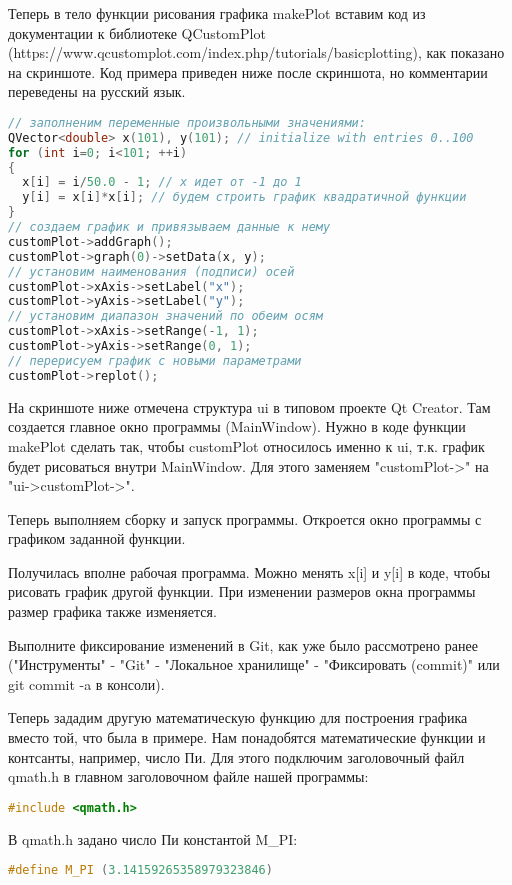 Теперь в тело функции рисования графика makePlot вставим код из документации к библиотеке QCustomPlot (https://www.qcustomplot.com/index.php/tutorials/basicplotting), как показано на скриншоте. Код примера приведен ниже после скриншота, но комментарии переведены на русский язык.

\begin{lstlisting}[language=c++]
// заполненим переменные произвольными значениями:
QVector<double> x(101), y(101); // initialize with entries 0..100
for (int i=0; i<101; ++i)
{
  x[i] = i/50.0 - 1; // x идет от -1 до 1
  y[i] = x[i]*x[i]; // будем строить график квадратичной функции
}
// создаем график и привязываем данные к нему
customPlot->addGraph();
customPlot->graph(0)->setData(x, y);
// установим наименования (подписи) осей
customPlot->xAxis->setLabel("x");
customPlot->yAxis->setLabel("y");
// установим диапазон значений по обеим осям
customPlot->xAxis->setRange(-1, 1);
customPlot->yAxis->setRange(0, 1);
// перерисуем график с новыми параметрами
customPlot->replot();
\end{lstlisting}

На скриншоте ниже отмечена структура ui в типовом проекте Qt Creator. Там создается главное окно программы (MainWindow). Нужно в коде функции makePlot сделать так, чтобы customPlot относилось именно к ui, т.к. график будет рисоваться внутри MainWindow. Для этого заменяем "customPlot->" на "ui->customPlot->".

Теперь выполняем сборку и запуск программы. Откроется окно программы с графиком заданной функции.

Получилась вполне рабочая программа. Можно менять x[i] и y[i] в коде, чтобы рисовать график другой функции. При изменении размеров окна программы размер графика также изменяется.

Выполните фиксирование изменений в Git, как уже было рассмотрено ранее ("Инструменты" - "Git" - "Локальное хранилище" - "Фиксировать (commit)" или git commit -a в консоли).

Теперь зададим другую математическую функцию для построения графика вместо той, что была в примере. Нам понадобятся математические функции и контсанты, например, число Пи. Для этого подключим заголовочный файл qmath.h в главном заголовочном файле нашей программы:
\begin{lstlisting}[language=c++]
#include <qmath.h>
\end{lstlisting}

В qmath.h задано число Пи константой M\_PI:
\begin{lstlisting}[language=c++]
#define M_PI (3.14159265358979323846)
\end{lstlisting}

\clearpage

